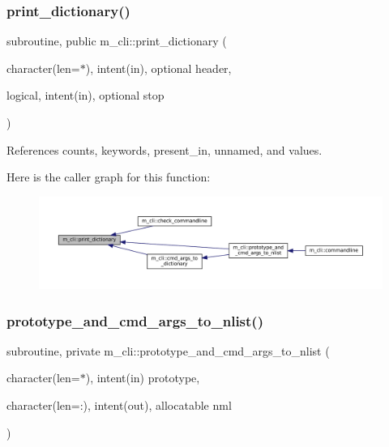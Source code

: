 \subsubsection{\texorpdfstring{print\+\_\+dictionary()}{print\_dictionary()}}
{\footnotesize\ttfamily subroutine, public m\+\_\+cli\+::print\+\_\+dictionary (\begin{DoxyParamCaption}\item[{character(len=$\ast$), intent(in), optional}]{header,  }\item[{logical, intent(in), optional}]{stop }\end{DoxyParamCaption})}



References counts, keywords, present\+\_\+in, unnamed, and values.

Here is the caller graph for this function\+:
\nopagebreak
\begin{figure}[H]
\begin{center}
\leavevmode
\includegraphics[width=350pt]{namespacem__cli_a5b6abaf1d5aec5e918be0759df29c849_icgraph}
\end{center}
\end{figure}
\mbox{\label{namespacem__cli_ac77d70573b34ade2079cc4004a6acba5}} 
\subsubsection{\texorpdfstring{prototype\+\_\+and\+\_\+cmd\+\_\+args\+\_\+to\+\_\+nlist()}{prototype\_and\_cmd\_args\_to\_nlist()}}
{\footnotesize\ttfamily subroutine, private m\+\_\+cli\+::prototype\+\_\+and\+\_\+cmd\+\_\+args\+\_\+to\+\_\+nlist (\begin{DoxyParamCaption}\item[{character(len=$\ast$), intent(in)}]{prototype,  }\item[{character(len=\+:), intent(out), allocatable}]{nml }\end{DoxyParamCaption})\hspace{0.3cm}{\ttfamily [private]}}



